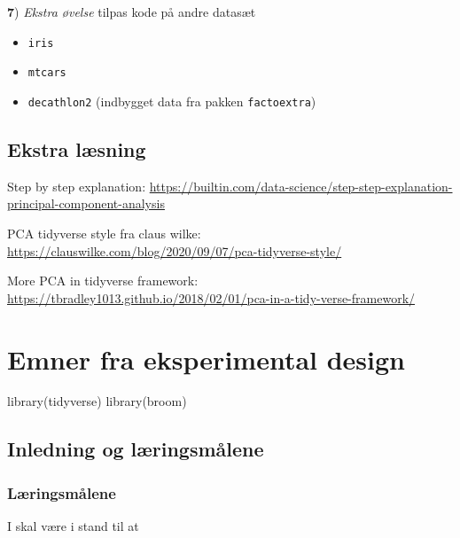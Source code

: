 \documentclass[
]{book}
\newenvironment{Shaded}{\begin{snugshade}}{\end{snugshade}}
\newcommand{\FunctionTok}[1]{\textcolor[rgb]{0.00,0.00,0.00}{#1}}
\newcommand{\NormalTok}[1]{#1}
\providecommand{\tightlist}{%
  \setlength{\itemsep}{0pt}\setlength{\parskip}{0pt}}
\begin{document}
\textbf{7}) \emph{Ekstra øvelse} tilpas kode på andre datasæt

\begin{itemize}
\tightlist
\item
  \texttt{iris}
\item
  \texttt{mtcars}
\item
  \texttt{decathlon2} (indbygget data fra pakken \texttt{factoextra})
\end{itemize}

\hypertarget{ekstra-luxe6sning}{%
\section{Ekstra læsning}\label{ekstra-luxe6sning}}

Step by step explanation: \url{https://builtin.com/data-science/step-step-explanation-principal-component-analysis}

PCA tidyverse style fra claus wilke: \url{https://clauswilke.com/blog/2020/09/07/pca-tidyverse-style/}

More PCA in tidyverse framework: \url{https://tbradley1013.github.io/2018/02/01/pca-in-a-tidy-verse-framework/}

\hypertarget{emner-fra-eksperimental-design}{%
\chapter{Emner fra eksperimental design}\label{emner-fra-eksperimental-design}}

\begin{Shaded}
\begin{Highlighting}[]
\FunctionTok{library}\NormalTok{(tidyverse)}
\FunctionTok{library}\NormalTok{(broom)}
\end{Highlighting}
\end{Shaded}

\hypertarget{inledning-og-luxe6ringsmuxe5lene-2}{%
\section{Inledning og læringsmålene}\label{inledning-og-luxe6ringsmuxe5lene-2}}

\hypertarget{luxe6ringsmuxe5lene-6}{%
\subsection{Læringsmålene}\label{luxe6ringsmuxe5lene-6}}

I skal være i stand til at
\end{document}
